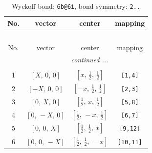 \documentclass[fleqn,8pt]{jsarticle}
\begin{document}
\begin{longtable}{cccc}
\caption{Wyckoff bond: {\tt 6b@6i}, bond symmetry: {\tt 2..}}
 \\
 \hline \hline
No. & vector & center & mapping \\ \hline \endfirsthead

\multicolumn{3}{l}{\tablename\ \thetable{}} \\
 \hline \hline
No. & vector & center & mapping \\ \hline \endhead

 \hline \hline
\multicolumn{3}{r}{\footnotesize\it continued ...} \\ \endfoot

 \hline \hline
\multicolumn{3}{r}{} \\ \endlastfoot

1 & $\left[ X,\, 0,\, 0 \right]$ & $\left[ x,\, \frac{1}{2},\, \frac{1}{2} \right]$ & {\tt [1,4]} \\ \hline
2 & $\left[ - X,\, 0,\, 0 \right]$ & $\left[ - x,\, \frac{1}{2},\, \frac{1}{2} \right]$ & {\tt [2,3]} \\ \hline
3 & $\left[ 0,\, X,\, 0 \right]$ & $\left[ \frac{1}{2},\, x,\, \frac{1}{2} \right]$ & {\tt [5,8]} \\ \hline
4 & $\left[ 0,\, - X,\, 0 \right]$ & $\left[ \frac{1}{2},\, - x,\, \frac{1}{2} \right]$ & {\tt [6,7]} \\ \hline
5 & $\left[ 0,\, 0,\, X \right]$ & $\left[ \frac{1}{2},\, \frac{1}{2},\, x \right]$ & {\tt [9,12]} \\ \hline
6 & $\left[ 0,\, 0,\, - X \right]$ & $\left[ \frac{1}{2},\, \frac{1}{2},\, - x \right]$ & {\tt [10,11]} \\
\end{longtable}
\renewcommand{\arraystretch}{1.2}
\end{document}
